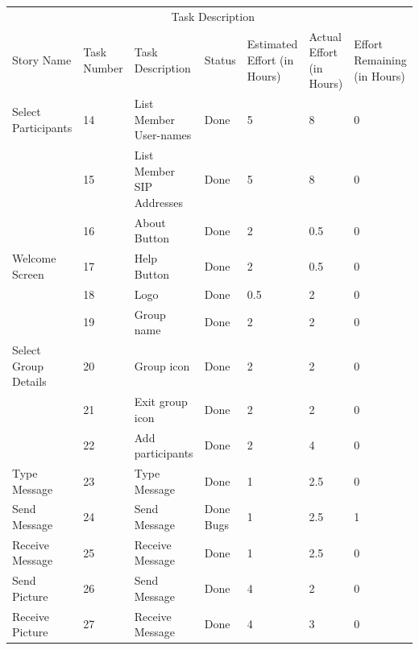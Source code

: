 \documentclass[a4paper]{article}
\begin{document}
\pagebreak
 

\begin{table} 
\begin{tabular}{p{3cm} p{1cm} p{3.5cm} p{1cm} p{1cm} p{1cm} p{1cm}} 
\hline %
& \multicolumn{5}{c}{Task Description} \\
\cmidrule(l){2-7}
Story Name & Task Number & Task Description & Status & Estimated Effort (in Hours) & Actual Effort (in Hours) & Effort Remaining (in Hours)\\ %
\hline

Select Participants & 14 & List Member User-names & Done & 5 & 8 & 0\\ \cmidrule(l){2-6}

 & 15 & List Member SIP Addresses & Done & 5 & 8 & 0\\ 
\midrule

& 16 & About Button & Done & 2 & 0.5 & 0\\ \cmidrule(l){2-6}

Welcome Screen & 17 & Help Button & Done & 2 & 0.5 & 0\\ \cmidrule(l){2-6}

& 18 & Logo & Done & 0.5 & 2 & 0\\ 
\midrule

 & 19 & Group name & Done & 2 & 2 & 0\\\cmidrule(l){2-6}

Select Group Details &  20  & Group icon & Done & 2 & 2 & 0\\\cmidrule(l){2-6}

 & 21 & Exit group icon & Done & 2 & 2 & 0\\\cmidrule(l){2-6}

 & 22 & Add participants & Done & 2 & 4 & 0\\ 
 \midrule

Type Message & 23 & Type Message & Done & 1 & 2.5 & 0\\ 
 \midrule
 
 Send Message & 24 & Send Message & Done Bugs & 1 & 2.5 & 1\\ 
 \midrule
 
 Receive Message & 25 & Receive Message & Done & 1 & 2.5 & 0\\ 
 \midrule
 
 Send Picture & 26 & Send Message & Done & 4 & 2 & 0\\ 
 \midrule
 
 Receive Picture & 27 & Receive Message & Done & 4 & 3 & 0\\ 
 \midrule
 

\end{tabular}
\end{table}
\end{document}
